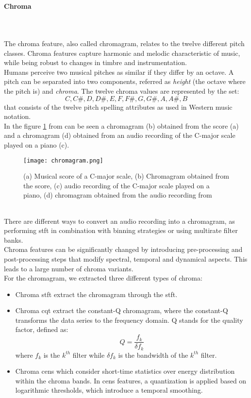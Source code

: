 \paragraph{Chroma}
\mbox{} \\ \\
The chroma feature, also called chromagram, relates to the twelve different pitch classes. Chroma features capture harmonic and melodic characteristic of music, while being robust to changes in timbre and instrumentation.
\\
Humans perceive two musical pitches as similar if they differ by an octave. A pitch can be separated into two components, referred as \textit{height} (the octave where the pitch is) and \textit{chroma}. The twelve chroma values are represented by the set:
\[{C, C\#, D, D\#, E , F, F\#, G, G\#, A, A\#, B}\]
that consists of the twelve pitch spelling attributes as used in Western music notation.
\\
In the figure \ref{fig:chromagram} from \cite{inproceedings} can be seen a chromagram (b) obtained from the score (a) and a chromagram (d) obtained from an audio recording of the C-major scale played on a piano (c).
\begin{figure}[h]
    \centering
    \texttt{[image: chromagram.png]} 
	\caption{(a) Musical score of a C-major scale, (b) Chromagram obtained from the score, (c) audio recording of the C-major scale played on a piano, (d) chromagram obtained from the audio recording from \cite{inproceedings}}
    \label{fig:chromagram}
\end{figure}
\\
There are different ways to convert an audio recording into a chromagram, as performing \gls{stft} in combination with binning strategies or using multirate filter banks.
\\ \indent
Chroma features can be significantly changed by introducing pre-processing and post-processing steps that modify spectral, temporal and dynamical aspects. This leads to a large number of chroma variants.
\\
For the chromagram, we extracted three different types of chroma:
\begin{itemize}
	\item Chroma \gls{stft} extract the chromagram through the \gls{stft}.
	\item Chroma cqt extract the constant-Q chromagram, where the constant-Q transforms the data series to the frequency domain. Q stands for the quality factor, defined as:
	\begin{equation}
		Q=\dfrac{f_k}{\delta f_k}
	\end{equation}
	where $f_k$ is the $k^{th}$ filter while $\delta f_k$ is the bandwidth of the $k^{th}$ filter.
	\item Chroma cens which consider short-time statistics over energy distribution within the chroma bands. In \gls{cens} features, a quantization is applied based on logarithmic thresholds, which introduce a temporal smoothing.
\end{itemize}
